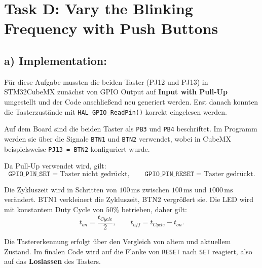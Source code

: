 
\section{Task D: Vary the Blinking Frequency with Push Buttons}

\subsection{a) Implementation:}
Für diese Aufgabe mussten die beiden Taster (PJ12 und PJ13) in STM32CubeMX zunächst von GPIO Output auf \textbf{Input with Pull-Up} umgestellt und der Code anschließend neu generiert werden. Erst danach konnten die Tasterzustände mit \texttt{HAL\_GPIO\_ReadPin()} korrekt eingelesen werden.

Auf dem Board sind die beiden Taster als \texttt{PB3} und \texttt{PB4} beschriftet. Im Programm werden sie über die Signale \texttt{BTN1} und \texttt{BTN2} verwendet, wobei in CubeMX beispielsweise \texttt{PJ13 = BTN2} konfiguriert wurde.

Da Pull-Up verwendet wird, gilt:
\[
	\texttt{GPIO\_PIN\_SET} = \text{Taster nicht gedrückt}, \qquad
	\texttt{GPIO\_PIN\_RESET} = \text{Taster gedrückt}.
\]

Die Zykluszeit wird in Schritten von \(100\,\mathrm{ms}\) zwischen \(100\,\mathrm{ms}\) und \(1000\,\mathrm{ms}\) verändert. BTN1 verkleinert die Zykluszeit, BTN2 vergrößert sie. Die LED wird mit konstantem Duty Cycle von \(50\%\) betrieben, daher gilt:
\[
	t_{on} = \frac{t_{Cycle}}{2}, \qquad t_{off} = t_{Cycle} - t_{on}.
\]

Die Tastererkennung erfolgt über den Vergleich von altem und aktuellem Zustand. Im finalen Code wird auf die Flanke von \texttt{RESET} nach \texttt{SET} reagiert, also auf das \textbf{Loslassen} des Tasters.

